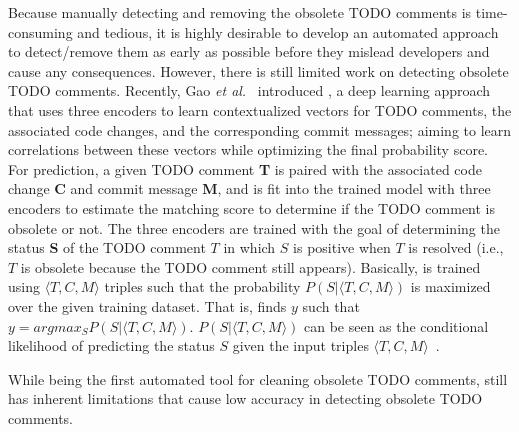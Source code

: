 Because manually detecting and removing the obsolete TODO comments is
time-consuming and tedious, it is highly desirable to develop an
automated approach to detect/remove them as early as possible before
they mislead developers and cause any consequences. However, there is
still limited work on detecting obsolete TODO comments. Recently, Gao
{\em et al.}~\cite{tdcleaner-fse21} introduced \tdcleaner, a deep
learning approach that uses three encoders to learn contextualized
vectors for TODO comments, the associated code changes, and the 
corresponding commit messages; aiming to learn correlations between
these vectors while optimizing the final probability 
score. For prediction, a given TODO comment {\bf T} is paired with 
the associated code change {\bf C} and commit message {\bf M}, and is fit 
into the trained \tdcleaner model
with three encoders to estimate the matching score to determine if the
TODO comment is obsolete or not. The three encoders are trained with
the goal of determining the status {\bf S} of the TODO comment $T$ in
which $S$ is positive when $T$ is resolved (i.e., $T$ is obsolete
because the TODO comment still appears). Basically, \tdcleaner is
trained using $\langle T, C, M \rangle$ triples such that the
probability $P(S | \langle T, C, M \rangle)$ is maximized over the
given training dataset. That is, \tdcleaner finds $y$ such that $y =
argmax_S P (S | \langle T, C, M \rangle)$. $P(S | \langle T, C, M
\rangle)$ can be seen as the conditional likelihood of predicting the
status $S$ given the input triples $\langle T, C, M
\rangle$~\cite{tdcleaner-fse21}.

While being the first automated tool for cleaning obsolete TODO
comments, \tdcleaner still has inherent limitations that cause low
accuracy in detecting obsolete TODO comments.

